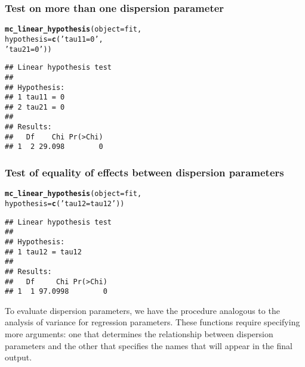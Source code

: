 \documentclass[article]{jss}\usepackage[]{graphicx}\usepackage[]{xcolor}
\makeatletter
\newcommand{\hlstr}[1]{\textcolor[rgb]{0.192,0.494,0.8}{#1}}%
\newcommand{\hlstd}[1]{\textcolor[rgb]{0.345,0.345,0.345}{#1}}%
\newcommand{\hlkwc}[1]{\textcolor[rgb]{0.333,0.667,0.333}{#1}}%
\newcommand{\hlkwd}[1]{\textcolor[rgb]{0.737,0.353,0.396}{\textbf{#1}}}%
\newenvironment{kframe}{%
 \def\at@end@of@kframe{}%
 \ifinner\ifhmode%
  \def\at@end@of@kframe{\end{minipage}}%
  \begin{minipage}{\columnwidth}%
 \fi\fi%
 \def\FrameCommand##1{\hskip\@totalleftmargin \hskip-\fboxsep
 \colorbox{shadecolor}{##1}\hskip-\fboxsep
     \hskip-\linewidth \hskip-\@totalleftmargin \hskip\columnwidth}%
 \MakeFramed {\advance\hsize-\width
   \@totalleftmargin\z@ \linewidth\hsize
   \@setminipage}}%
 {\par\unskip\endMakeFramed%
 \at@end@of@kframe}
\newenvironment{knitrout}{}{} %
\makeatother
\begin{document}
\subsubsection{Test on more than one dispersion parameter}

\begin{knitrout}
\color{fgcolor}\begin{kframe}
\begin{alltt}
\hlkwd{mc_linear_hypothesis}\hlstd{(}\hlkwc{object} \hlstd{=  fit,}
                     \hlkwc{hypothesis} \hlstd{=} \hlkwd{c}\hlstd{(}\hlstr{'tau11 = 0'}\hlstd{,}
                                    \hlstr{'tau21 = 0'}\hlstd{))}
\end{alltt}
\begin{verbatim}
## Linear hypothesis test
## 
## Hypothesis:           
## 1 tau11 = 0
## 2 tau21 = 0
## 
## Results:
##   Df    Chi Pr(>Chi)
## 1  2 29.098        0
\end{verbatim}
\end{kframe}
\end{knitrout}

\subsubsection{Test of equality of effects between dispersion parameters}

\begin{knitrout}
\color{fgcolor}\begin{kframe}
\begin{alltt}
\hlkwd{mc_linear_hypothesis}\hlstd{(}\hlkwc{object} \hlstd{=  fit,}
                     \hlkwc{hypothesis} \hlstd{=} \hlkwd{c}\hlstd{(}\hlstr{'tau12 = tau12'}\hlstd{))}
\end{alltt}
\begin{verbatim}
## Linear hypothesis test
## 
## Hypothesis:               
## 1 tau12 = tau12
## 
## Results:
##   Df     Chi Pr(>Chi)
## 1  1 97.0998        0
\end{verbatim}
\end{kframe}
\end{knitrout}

To evaluate dispersion parameters, we have the procedure analogous to the analysis of variance for regression parameters. These functions require specifying more arguments: one that determines the relationship between dispersion parameters and the other that specifies the names that will appear in the final output.
\end{document}
